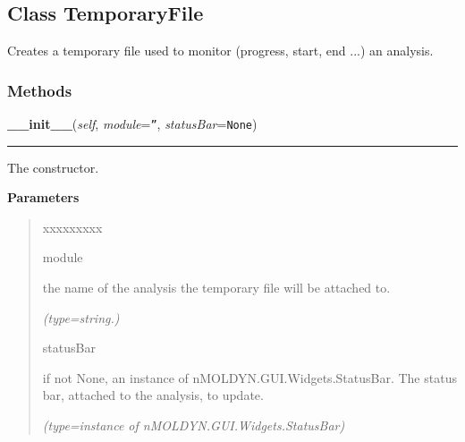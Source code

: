 \subsection{Class TemporaryFile}

    \label{nMOLDYN:Core:IOFiles:TemporaryFile}
Creates a temporary file used to monitor (progress, start, end  ...) an 
analysis.



  \subsubsection{Methods}

    \label{nMOLDYN:Core:IOFiles:TemporaryFile:__init__}

    \vspace{0.5ex}

\hspace{.8\funcindent}\begin{boxedminipage}{\funcwidth}

    \raggedright \textbf{\_\_init\_\_}(\textit{self}, \textit{module}={\tt ''}, \textit{statusBar}={\tt None})

    \vspace{-1.5ex}

    \rule{\textwidth}{0.5\fboxrule}
\setlength{\parskip}{2ex}
    The constructor.

\setlength{\parskip}{1ex}
      \textbf{Parameters}
      \vspace{-1ex}

      \begin{quote}
        \begin{Ventry}{xxxxxxxxx}

          \item[module]

          the name of the analysis the temporary file will be attached to.

            {\it (type=string.)}

          \item[statusBar]

          if not None, an instance of nMOLDYN.GUI.Widgets.StatusBar. The 
          status bar, attached to the analysis, to update.

            {\it (type=instance of nMOLDYN.GUI.Widgets.StatusBar)}

        \end{Ventry}

      \end{quote}

    \end{boxedminipage}

